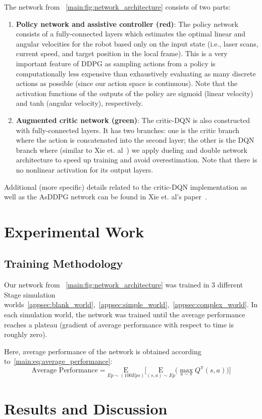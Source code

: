 The network from ~\autoref{main:fig:network_architecture} consists of two parts:
\begin{enumerate}
\item \textbf{Policy network and assistive controller (red)}: The policy network consists of a fully-connected layers which estimates the optimal linear and angular velocities for the robot based only on the input state (i.e., laser scans, current speed, and target position in the local frame). This is a very important feature of DDPG as sampling actions from a policy is computationally less expensive than exhaustively evaluating as many discrete actions as possible (since our action space is continuous). Note that the activation functions of the outputs of the policy are sigmoid (linear velocity) and tanh (angular velocity), respectively. 
\item \textbf{Augmented critic network (green)}: The critic-DQN is also constructed with fully-connected layers. It has two branches: one is the critic branch where the action is concatenated into the second layer; the other is the DQN branch where (similar to Xie et. al~\cite{xie_learning_2018}) we apply dueling and double network architecture to speed up training and avoid overestimation. Note that there is no nonlinear activation for its output layers.
\end{enumerate}

Additional (more specific) details related to the critic-DQN implementation as well as the AsDDPG network can be found in Xie et. al's paper~\cite{xie_learning_2018}.

\section{Experimental Work}
\subsection{Training Methodology}
Our network from ~\autoref{main:fig:network_architecture} was trained in 3 different Stage simulation worlds~\ref{appsec:blank_world},~\ref{appsec:simple_world},~\ref{appsec:complex_world}. In each simulation world, the network was trained until the average performance reaches a plateau (gradient of average performance with respect to time is roughly zero).

Here, average performance of the network is obtained according to~\autoref{main:eq:average_performance}:
\begin{equation}
\text{Average Performance} = \underset{Ep \sim (100 Eps)}{\mathrm E}\bigg[\underset{(s, a) \sim Ep}{\mathrm E} \big(\underset{a \sim \pi}{\max} Q^{\pi}(s, a)\big)\bigg]
\label{main:eq:average_performance}
\end{equation}



\section{Results and Discussion}
